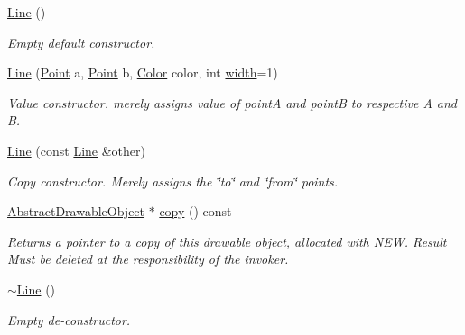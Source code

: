 \begin{DoxyCompactItemize}
\item 
\mbox{\label{classcturtle_1_1Line_ac6d8c8133ddbb5cafa31be364b0ed4f6}} 
\hyperlink{classcturtle_1_1Line_ac6d8c8133ddbb5cafa31be364b0ed4f6}{Line} ()
\begin{DoxyCompactList}\small\item\em Empty default constructor. \end{DoxyCompactList}\item 
\hyperlink{classcturtle_1_1Line_ae08d302308c4b10cc714508b2acca228}{Line} (\hyperlink{structcturtle_1_1ivec2}{Point} a, \hyperlink{structcturtle_1_1ivec2}{Point} b, \hyperlink{classcturtle_1_1Color}{Color} color, int \hyperlink{classcturtle_1_1Line_ae0c426af211fc443b7ad2bed4c30050b}{width}=1)
\begin{DoxyCompactList}\small\item\em Value constructor. merely assigns value of pointA and pointB to respective A and B. \end{DoxyCompactList}\item 
\hyperlink{classcturtle_1_1Line_ac1b144ecd3e23c5f296b4f845f332c73}{Line} (const \hyperlink{classcturtle_1_1Line}{Line} \&other)
\begin{DoxyCompactList}\small\item\em Copy constructor. Merely assigns the \char`\"{}to\char`\"{} and \char`\"{}from\char`\"{} points. \end{DoxyCompactList}\item 
\mbox{\label{classcturtle_1_1Line_a004870caac1e5632064ff28ae5a7e0ff}} 
\hyperlink{classcturtle_1_1AbstractDrawableObject}{Abstract\+Drawable\+Object} $\ast$ \hyperlink{classcturtle_1_1Line_a004870caac1e5632064ff28ae5a7e0ff}{copy} () const
\begin{DoxyCompactList}\small\item\em Returns a pointer to a copy of this drawable object, allocated with N\+EW. Result Must be deleted at the responsibility of the invoker. \end{DoxyCompactList}\item 
\mbox{\label{classcturtle_1_1Line_a885276e725f86d89f79b32ee3d885079}} 
\hyperlink{classcturtle_1_1Line_a885276e725f86d89f79b32ee3d885079}{$\sim$\+Line} ()
\begin{DoxyCompactList}\small\item\em Empty de-\/constructor. \end{DoxyCompactList}\item 

\end{DoxyCompactItemize}
